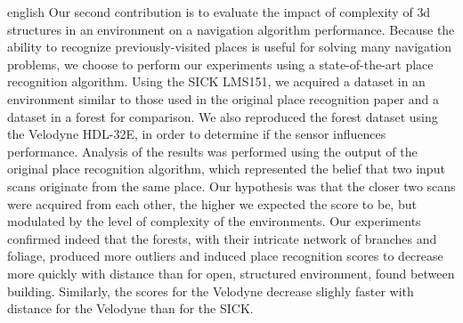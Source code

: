 \begin{otherlanguage*}{english}
    Our second contribution is to evaluate the impact of complexity of \gls*{3d} structures in an environment on a navigation algorithm performance. Because the ability to recognize previously-visited places is useful for solving many navigation problems, we choose to perform our experiments using a state-of-the-art place recognition algorithm. Using the SICK LMS151, we acquired a dataset in an environment similar to those used in the original place recognition paper and a dataset in a forest for comparison. We also reproduced the forest dataset using the Velodyne HDL-32E, in order to determine if the sensor influences performance. Analysis of the results was performed using the output of the original place recognition algorithm, which represented the belief that two input scans originate from the same place. Our hypothesis was that the closer two scans were acquired from each other, the higher we expected the score to be, but modulated by the level of complexity of the environments. Our experiments confirmed indeed that the forests, with their intricate network of branches and foliage, produced more outliers and induced place recognition scores to decrease more quickly with distance than for open, structured environment, found between building. Similarly, the scores for the Velodyne decrease slighly faster with distance for the Velodyne than for the SICK. 

\end{otherlanguage*} 
